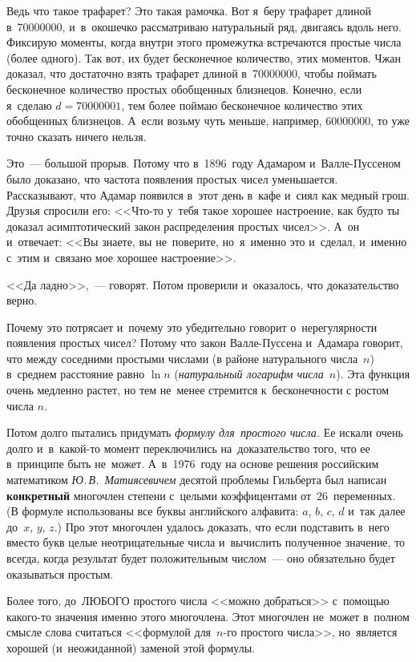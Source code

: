 
Ведь что такое трафарет? Это такая рамочка. Вот я~беру трафарет длиной в~70000000, и~в~окошечко
рассматриваю натуральный ряд, двигаясь вдоль него. Фиксирую моменты, когда внутри этого промежутка встречаются простые
числа (более одного). Так вот, их будет бесконечное количество, этих моментов. Чжан доказал, что
достаточно взять трафарет длиной в~70000000, чтобы поймать бесконечное количество простых
обобщенных близнецов. Конечно, если я~сделаю $d=70 000 001$, тем более поймаю бесконечное количество
этих обобщенных близнецов. А~если возьму чуть меньше, например, 60000000, то уже точно
сказать ничего нельзя.


Это~--- большой прорыв. Потому что в~1896~году Адамаром и~Валле-Пуссеном было доказано, что частота
появления простых чисел уменьшается. Рассказывают, что Адамар появился в~этот день в~кафе и~сиял
как медный грош. Друзья спросили его: <<Что-то у~тебя такое хорошее настроение, как будто ты
доказал асимптотический закон распределения простых чисел>>. А~он и~отвечает: <<Вы знаете, вы
не~поверите, но~я~именно это и~сделал, и~именно с~этим и~связано мое хорошее настроение>>.

<<Да ладно>>,~--- говорят. Потом проверили и~оказалось, что доказательство верно.

Почему это потрясает и~почему это убедительно говорит о~нерегулярности появления простых чисел?
Потому что закон Валле-Пуссена и~Адамара говорит, что между соседними простыми числами
(в районе натурального числа~$n$) в~среднем расстояние равно $\ln n$ (\textit{натуральный логарифм
числа~$n$}). Эта функция очень медленно растет, но тем не~менее стремится к~бесконечности с ростом числа $n$.

Потом долго пытались придумать \textit{формулу для~простого числа.} Ее искали очень долго и~в~какой-то
момент переключились на~доказательство того, что ее в~принципе быть не~может. А~в~1976~году на основе решения
российским математиком \textit{Ю.\,В.~Матиясевичем} десятой проблемы Гильберта был написан \textbf{конкретный}
многочлен  степени с~целыми
коэффицентами от~$26$~переменных. (В формуле использованы все буквы английского алфавита: $a$, $b$, $c$, $d$ и~так
далее до~$x$, $y$, $z$.) Про этот многочлен удалось доказать, что если подставить в~него вместо букв
целые неотрицательные числа и~вычислить полученное значение, то всегда, когда результат будет положительным
числом~--- оно обязательно будет оказываться простым.


Более того, до~ЛЮБОГО простого числа <<можно добраться>> с~помощью какого-то значения именно этого
многочлена. Этот многочлен не~может в~полном смысле слова считаться <<формулой для~$n$-го простого
числа>>, но~является хорошей (и~неожиданной) заменой этой формулы.

